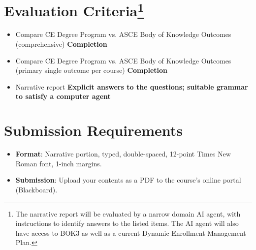 \documentclass[12pt]{article}
\begin{document}
\section*{\small{Evaluation Criteria\footnote{The narrative report will be evaluated by a narrow domain AI agent, with instructions to identify answers to the listed items.  The AI agent will also have access to BOK3 as well as a current Dynamic Enrollment Management Plan.}}}
\begin{itemize}
    \item Compare CE Degree Program vs. ASCE Body of Knowledge Outcomes (comprehensive) \textbf{Completion}
    \item Compare CE Degree Program vs. ASCE Body of Knowledge Outcomes (primary single outcome per course) \textbf{Completion}
    \item Narrative report \textbf{Explicit answers to the questions; suitable grammar to satisfy a computer agent}
\end{itemize}

\section*{\small{Submission Requirements}}
\begin{itemize}
    \item \textbf{Format}: Narrative portion, typed, double-spaced, 12-point Times New Roman font, 1-inch margins.
    \item \textbf{Submission}: Upload your contents as a PDF to the course’s online portal (Blackboard).
\end{itemize}
\end{document}
